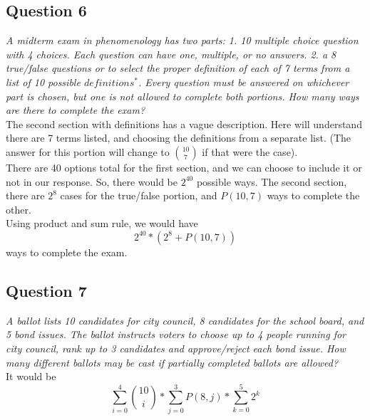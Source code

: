 \documentclass{article}
\begin{document}
\subsection{Question 6}
\emph{A midterm exam in phenomenology has two parts: 1. 10 multiple choice question with 4 choices. Each question can have one, multiple, or no answers. 2. a 8 true/false questions or to select the proper definition of each of 7 terms from a list of 10 possible $definitions^{*}$. Every question must be answered on whichever part is chosen, but one is not allowed to complete both portions. How many ways are there to complete the exam?}
\medskip
\\
The second section with definitions has a vague description. Here will understand there are 7 terms listed, and choosing the definitions from a separate list. (The answer for this portion will change to ${10\choose 7}$ if that were the case).
\\
\medskip
There are 40 options total for the first section, and we can choose to include it or not in our response. So, there would be $2^{40}$ possible ways. The second section, there are $2^8$ cases for the true/false portion, and $P(10, 7)$ ways to complete the other.
\\
\medskip
Using product and sum rule, we would have
$$2^{40} * (2^8 + P(10, 7))$$ 
ways to complete the exam.
\\
\bigskip
\subsection{Question 7}
\emph{A ballot lists 10 candidates for city council, 8 candidates for the school board, and 5 bond issues. The ballot instructs voters to choose up to 4 people running for city council, rank up to 3 candidates and approve/reject each bond issue. How many different ballots may be cast if partially completed ballots are allowed?}
\\
\medskip
It would be
$$\sum_{i=0}^4 {10 \choose i} * \sum_{j=0}^3 P(8, j) * \sum_{k=0}^5 2^k$$
\newpage
\end{document}
